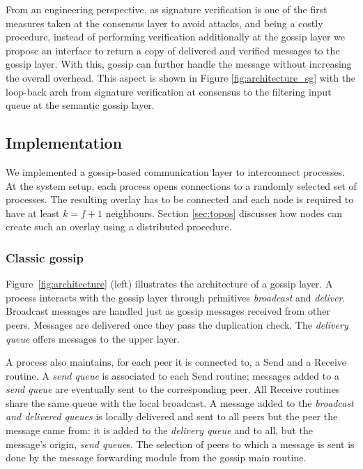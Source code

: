 From an engineering perspective, as signature verification is one of the first measures taken at the consensus layer to avoid attacks, and being a costly procedure, instead of performing verification additionally at the gossip layer we propose an interface to return a copy of delivered and verified messages to the gossip layer.   With this, gossip can further handle the message without increasing the overall overhead.
This aspect is shown in Figure \ref{fig:architecture_sg} with the loop-back arch from signature verification at consensus to the filtering input queue at the semantic gossip layer.




\subsection{Implementation}
\label{sec:impl}


We implemented a gossip-based communication layer to interconnect processes.
At the system setup, each process opens connections to a randomly selected set
of processes.  The resulting overlay has to be connected and each node is required to have at least $k=f+1$ neighbours.
Section \ref{sec:topos} discusses how nodes can create such an overlay using a distributed procedure.


\subsubsection{Classic gossip}

Figure~\ref{fig:architecture} (left) illustrates the architecture of a gossip layer.
A process interacts with the gossip layer through primitives {\em broadcast} and {\em deliver}.   Broadcast messages are handled just as gossip messages received from other peers.   Messages are delivered once they pass the duplication check.
The {\em delivery queue} offers messages to the upper layer.

A process also maintains, for each peer it is connected to, a Send and a
Receive routine. A {\em send queue} is associated to each Send routine; messages added to a {\em send queue} are eventually sent to the corresponding peer.
All Receive routines share the same queue with the local broadcast.  
%
A message added to the {\em broadcast and delivered queues} is locally delivered and sent to
all peers but the peer the message came from: it is added to the {\em delivery
queue} and to all, but the message's origin, {\em send queue}s.
%
The selection of peers to which a message is sent is done by the message
forwarding module from the gossip main routine.    

